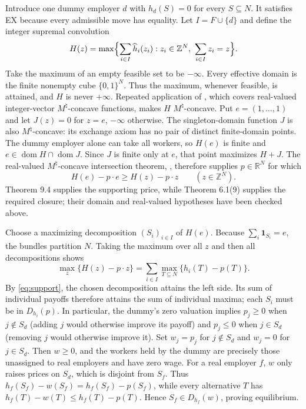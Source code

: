 \documentclass[11pt]{article}
\theoremstyle{definition}
\theoremstyle{remark}
\numberwithin{equation}{section}
\begin{document}
Introduce one dummy employer $d$ with $h_d(S)=0$ for every $S\subseteq N$. It satisfies EX because every admissible move has equality. Let $I=F\cup\{d\}$ and define the integer supremal convolution
\[
H(z)=\max\Bigl\{\sum_{i\in I}\widehat h_i(z_i):
  z_i\in\mathbb Z^N,\ \sum_{i\in I}z_i=z\Bigr\}.
\]
Take the maximum of an empty feasible set to be $-\infty$. Every effective domain is the finite nonempty cube $\{0,1\}^N$. Thus the maximum, whenever feasible, is attained, and $H$ is never $+\infty$. Repeated application of \citet[Theorem 6.1(9)]{Murota2022}, which covers real-valued integer-vector $M^\natural$-concave functions, makes $H$ $M^\natural$-concave. Put $e=(1,\ldots,1)$ and let $J(z)=0$ for $z=e$, $-\infty$ otherwise. The singleton-domain function $J$ is also $M^\natural$-concave: its exchange axiom has no pair of distinct finite-domain points. The dummy employer alone can take all workers, so $H(e)$ is finite and $e\in\operatorname{dom}H\cap\operatorname{dom}J$. Since $J$ is finite only at $e$, that point maximizes $H+J$. The real-valued $M^\natural$-concave intersection theorem, \citet[Theorem 9.4]{Murota2022}, therefore supplies $p\in\mathbb R^N$ for which
\begin{equation}
H(e)-p\cdot e\ge H(z)-p\cdot z\qquad(z\in\mathbb Z^N).\label{eq:support}
\end{equation}
Theorem 9.4 supplies the supporting price, while Theorem 6.1(9) supplies the required closure; their domain and real-valued hypotheses have been checked above.

Choose a maximizing decomposition $(S_i)_{i\in I}$ of $H(e)$. Because $\sum_i\mathbf1_{S_i}=e$, the bundles partition $N$. Taking the maximum over all $z$ and then all decompositions shows
\[
\max_z\{H(z)-p\cdot z\}
=\sum_{i\in I}\max_{T\subseteq N}\{h_i(T)-p(T)\}.
\]
By \eqref{eq:support}, the chosen decomposition attains the left side. Its sum of individual payoffs therefore attains the sum of individual maxima; each $S_i$ must be in $D_{h_i}(p)$. In particular, the dummy's zero valuation implies $p_j\ge0$ when $j\notin S_d$ (adding $j$ would otherwise improve its payoff) and $p_j\le0$ when $j\in S_d$ (removing $j$ would otherwise improve it). Set $w_j=p_j$ for $j\notin S_d$ and $w_j=0$ for $j\in S_d$. Then $w\ge0$, and the workers held by the dummy are precisely those unassigned to real employers and have zero wage. For a real employer $f$, $w$ only raises prices on $S_d$, which is disjoint from $S_f$. Thus $h_f(S_f)-w(S_f)=h_f(S_f)-p(S_f)$, while every alternative $T$ has $h_f(T)-w(T)\le h_f(T)-p(T)$. Hence $S_f\in D_{h_f}(w)$, proving equilibrium.
\end{document}
